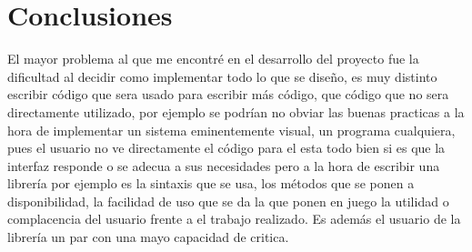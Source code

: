 \chapter{Conclusiones}

El mayor problema al que me  encontré en el desarrollo del proyecto fue la dificultad al decidir como implementar todo lo que se diseño, es muy distinto escribir código que sera usado para escribir más código, que código que no sera directamente utilizado, por ejemplo se podrían no obviar las buenas practicas a la hora de implementar un sistema eminentemente visual, un programa cualquiera, pues el usuario no ve directamente el código para el esta todo bien si es que la interfaz responde o se adecua a sus necesidades pero a la hora de escribir una librería por ejemplo es la sintaxis que se usa, los métodos que se ponen a disponibilidad, la facilidad de uso que se da la que ponen en juego la utilidad o complacencia del usuario frente a el trabajo realizado. Es además el usuario de la librería un par con una mayo capacidad de critica.